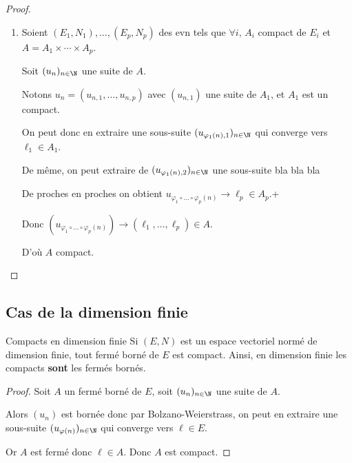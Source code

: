 \begin{proof}
\begin{enumerate}
        Or $\forall n \in \N, \, N(u_{\varphi(n)} - a) > \varepsilon$, 
        donc à la limite $0 \geqslant \varepsilon$, absurde.

        \item Soient $(E_1, N_1), \ldots, (E_p, N_p)$ des evn tels que 
        $\forall i, \, A_i$ compact de $E_i$ et $A = A_1 \times \cdots \times A_p$. 

        Soit $(u_n)_{n \in \N}$ une suite de $A$.

        Notons $u_n = (u_{n, 1}, \ldots, u_{n, p})$ avec $(u_{n, 1})$ une suite de $A_1$, et $A_1$ est un compact. 

        On peut donc en extraire une sous-suite $(u_{\varphi_1(n), 1})_{n \in \N}$ qui converge vers $\ell_1 \in A_1$.

        De même, on peut extraire de $(u_{\varphi_1(n), 2})_{n \in \N}$ une sous-suite bla bla bla 

        De proches en proches on obtient $u_{\varphi_1 \circ \ldots \circ \varphi_p(n)} \to \ell_p \in A_p$.+

        Donc $(u_{\varphi_1 \circ \ldots \circ \varphi_p(n)}) \to (\ell_1, \ldots, \ell_p) \in A$.

        D'où $A$ compact. 
    \end{enumerate}
\end{proof}



\subsection{Cas de la dimension finie}

\begin{theoreme}{Compacts en dimension finie}{}
    Si $(E, N)$ est un espace vectoriel normé de dimension finie, tout fermé borné de $E$ est compact. Ainsi, en 
    dimension finie les compacts \textbf{sont} les fermés bornés. 
\end{theoreme}


\begin{proof}
    Soit $A$ un fermé borné de $E$, soit $(u_n)_{n \in \N}$ une suite de $A$.

    Alors $(u_n)$ est bornée donc par Bolzano-Weierstrass, on peut en extraire une
    sous-suite $(u_{\varphi(n)})_{n \in \N}$ qui converge vers $\ell \in E$.

    Or $A$ est fermé donc $\ell \in A$. Donc $A$ est compact.
\end{proof}



